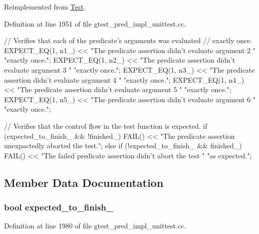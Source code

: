 \-Reimplemented from \hyperlink{classtesting_1_1Test_a931587596081ef8178c2b128facb0411}{\-Test}.



\-Definition at line 1951 of file gtest\-\_\-pred\-\_\-impl\-\_\-unittest.\-cc.


\begin{DoxyCode}
                          {
    // Verifies that each of the predicate's arguments was evaluated
    // exactly once.
    EXPECT_EQ(1, n1_) <<
        "The predicate assertion didn't evaluate argument 2 "
        "exactly once.";
    EXPECT_EQ(1, n2_) <<
        "The predicate assertion didn't evaluate argument 3 "
        "exactly once.";
    EXPECT_EQ(1, n3_) <<
        "The predicate assertion didn't evaluate argument 4 "
        "exactly once.";
    EXPECT_EQ(1, n4_) <<
        "The predicate assertion didn't evaluate argument 5 "
        "exactly once.";
    EXPECT_EQ(1, n5_) <<
        "The predicate assertion didn't evaluate argument 6 "
        "exactly once.";

    // Verifies that the control flow in the test function is expected.
    if (expected_to_finish_ && !finished_) {
      FAIL() << "The predicate assertion unexpactedly aborted the test.";
    } else if (!expected_to_finish_ && finished_) {
      FAIL() << "The failed predicate assertion didn't abort the test "
                "as expected.";
    }
  }
\end{DoxyCode}


\subsection{\-Member \-Data \-Documentation}
\hypertarget{classPredicate5Test_af30fae6aaebdd5a6cb055c420573754d}{
\subsubsection[{expected\-\_\-to\-\_\-finish\-\_\-}]{\setlength{\rightskip}{0pt plus 5cm}bool {\bf expected\-\_\-to\-\_\-finish\-\_\-}}}\label{d3/d98/classPredicate5Test_af30fae6aaebdd5a6cb055c420573754d}


\-Definition at line 1980 of file gtest\-\_\-pred\-\_\-impl\-\_\-unittest.\-cc.

